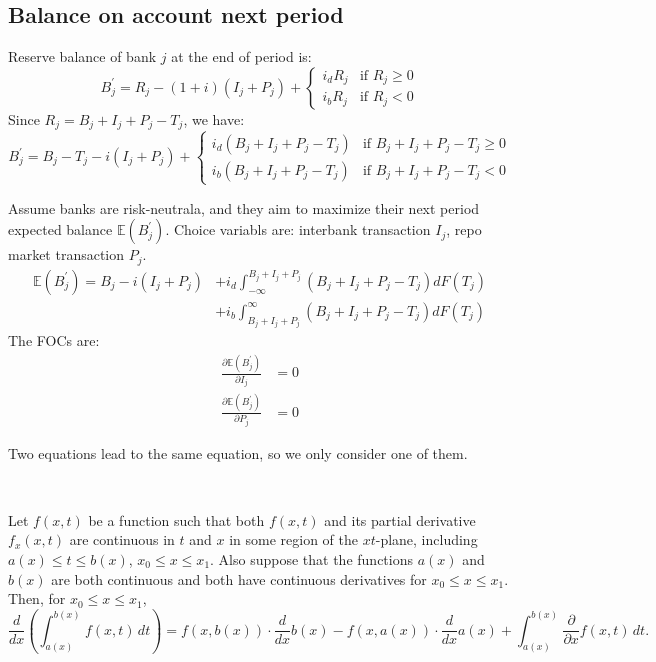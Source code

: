 \subsection{Balance on account next period}

Reserve balance of bank $j$ at the end of period is:
\[
B^{\prime} _j = R_j - (1+i)(I_j + P_j) + \left\{\begin{matrix}
   i_d R_j & \text{if } R_j \geq 0\\
   i_b R_j & \text{if } R_j < 0
  \end{matrix}\right.
\]
Since $R_j = B_j + I_j + P_j - T_j$, we have:
\[
B^{\prime} _j = B_j - T_j - i(I_j + P_j) + \left\{\begin{matrix}
   i_d (B_j + I_j + P_j - T_j) & \text{if } B_j + I_j + P_j - T_j \geq 0\\
   i_b (B_j + I_j + P_j - T_j) & \text{if } B_j + I_j + P_j - T_j < 0
  \end{matrix}\right.
\]

Assume banks are risk-neutrala, and they aim to maximize their next period expected balance $\mathbb{E}(B^{\prime}_j)$.
Choice variabls are: interbank transaction $I_j$, repo market transaction $P_j$.
\begin{align*}
    \mathbb{E}(B^{\prime}_j) = B_j - i(I_j + P_j) &+ i_d \int_{-\infty}^{B_j + I_j + P_j} (B_j + I_j + P_j - T_j) dF(T_j) \\
    &+ i_b \int_{B_j + I_j + P_j}^{\infty} (B_j + I_j + P_j - T_j) dF(T_j)
\end{align*}
The FOCs are:
\begin{align*}
    \frac{\partial \mathbb{E}(B^{\prime}_j)}{\partial I_j} &= 0 \\
    \frac{\partial \mathbb{E}(B^{\prime}_j)}{\partial P_j} &= 0
\end{align*}

Two equations lead to the same equation, so we only consider one of them.
\begin{theorem}
    \ 
    
    Let $f(x, t)$ be a function such that both $f(x, t)$ and 
    its partial derivative $f_x(x, t)$ are continuous in $t$ and 
    $x$ in some region of the $xt$-plane, 
    including $a(x) \leq t \leq b(x)$, $x_0 \leq x \leq x_1$. 
    Also suppose that the functions $a(x)$ and $b(x)$ are both continuous 
    and both have continuous derivatives for $x_0 \leq x \leq x_1$. 
    Then, for $x_0 \leq x \leq x_1$,
    \[
    \frac{d}{dx} \left( \int_{a(x)}^{b(x)} f(x, t) \, dt \right) = f(x, b(x)) \cdot \frac{d}{dx} b(x) - f(x, a(x)) \cdot \frac{d}{dx} a(x) + \int_{a(x)}^{b(x)} \frac{\partial}{\partial x} f(x, t) \, dt.
    \]
\end{theorem}

